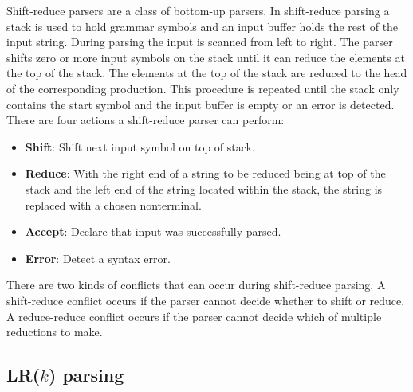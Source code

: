 Shift-reduce parsers are a class of bottom-up parsers. In shift-reduce parsing a stack is used to hold grammar symbols and an input buffer holds the rest of the input string.
During parsing the input is scanned from left to right. The parser shifts zero or more input symbols on the stack until it can reduce the elements at the top of the stack. The elements at the top of the stack are reduced to the head of the corresponding production. This procedure is repeated until the stack only contains the start symbol and the input buffer is empty or an error is detected. \cite{Aho.2007}\\
There are four actions a shift-reduce parser can perform:
\begin{itemize}%
	\item \textbf{Shift}: Shift next input symbol on top of stack.
	\item \textbf{Reduce}: With the right end of a string to be reduced being at top of the stack and the left end of the string located within the stack, the string is replaced with a  chosen nonterminal.
	\item \textbf{Accept}: Declare that input was successfully parsed.
	\item \textbf{Error}: Detect a syntax error.
\end{itemize}
\cite{Aho.2007}


There are two kinds of conflicts that can occur during shift-reduce parsing. A shift-reduce conflict occurs if the parser cannot decide whether to shift or reduce.
A reduce-reduce conflict occurs if the parser cannot decide which of multiple reductions to make.\cite{Aho.2007}


\subsection{LR($k$) parsing}\label{sec:BackgroundParserLR}

